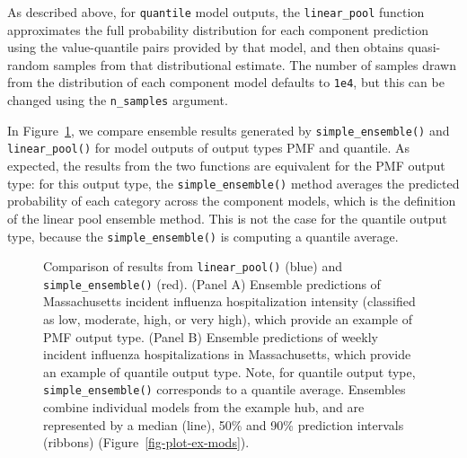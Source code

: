\documentclass[
  letterpaper,
  DIV=11,
  numbers=noendperiod]{scrartcl}
\begin{document}
As described above, for \texttt{quantile} model outputs, the
\texttt{linear\_pool} function approximates the full probability
distribution for each component prediction using the value-quantile
pairs provided by that model, and then obtains quasi-random samples from
that distributional estimate. The number of samples drawn from the
distribution of each component model defaults to \texttt{1e4}, but this
can be changed using the \texttt{n\_samples} argument.

In Figure~\ref{fig-plot-ex-quantile-and-linear-pool}, we compare
ensemble results generated by \texttt{simple\_ensemble()} and
\texttt{linear\_pool()} for model outputs of output types PMF and
quantile. As expected, the results from the two functions are equivalent
for the PMF output type: for this output type, the
\texttt{simple\_ensemble()} method averages the predicted probability of
each category across the component models, which is the definition of
the linear pool ensemble method. This is not the case for the quantile
output type, because the \texttt{simple\_ensemble()} is computing a
quantile average.

\begin{figure}


\caption{\label{fig-plot-ex-quantile-and-linear-pool}Comparison of
results from \texttt{linear\_pool()} (blue) and
\texttt{simple\_ensemble()} (red). (Panel A) Ensemble predictions of
Massachusetts incident influenza hospitalization intensity (classified
as low, moderate, high, or very high), which provide an example of PMF
output type. (Panel B) Ensemble predictions of weekly incident influenza
hospitalizations in Massachusetts, which provide an example of quantile
output type. Note, for quantile output type, \texttt{simple\_ensemble()}
corresponds to a quantile average. Ensembles combine individual models
from the example hub, and are represented by a median (line), 50\% and
90\% prediction intervals (ribbons) (Figure~\ref{fig-plot-ex-mods}).}

\end{figure}%
\end{document}

